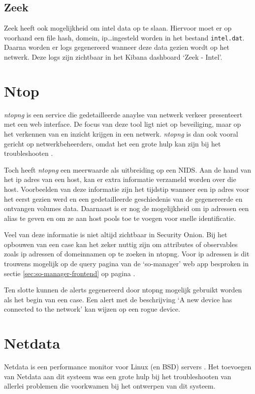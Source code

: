 \documentclass[a4paper,12pt]{report}
\begin{document}
\subsection{Zeek}
Zeek heeft ook mogelijkheid om intel data op te slaan.
Hiervoor moet er op voorhand een file hash, domein, ip\dots ingesteld worden in het bestand \lstinline|intel.dat|.
Daarna worden er logs gegenereerd wanneer deze data gezien wordt op het netwerk.
Deze logs zijn zichtbaar in het Kibana dashboard `Zeek - Intel'.

\section{Ntop}
\emph{ntopng} is een service die gedetailleerde anaylse van netwerk verkeer presenteert met een web interface.
De focus van deze tool ligt niet op beveiliging, maar op het verkennen van en inzicht krijgen in een netwerk.
\emph{ntopng} is dan ook vooral gericht op netwerkbeheerders, omdat het een grote hulp kan zijn bij het troubleshooten \autocite{ntop:ntopng}.

Toch heeft \emph{ntopng} een meerwaarde als uitbreiding op een NIDS.
Aan de hand van het ip adres van een host, kan er extra informatie verzameld worden over die host.
Voorbeelden van deze informatie zijn het tijdstip wanneer een ip adres voor het eerst gezien werd en een gedetailleerde geschiedenis van de gegenereerde en ontvangen volumes data.
Daarnaast is er nog de mogelijkheid om ip adressen een alias te geven en om ze aan host pools toe te voegen voor snelle identificatie.

Veel van deze informatie is niet altijd zichtbaar in Security Onion.
Bij het opbouwen van een case kan het zeker nuttig zijn om attributes of observables zoals ip adressen of domeinnamen op te zoeken in ntopng.
Voor ip adressen is dit trouwens mogelijk op de query pagina van de `so-manager' web app besproken in sectie \ref{sec:so-manager-frontend} op pagina \pageref{sec:so-manager-frontend}.

Ten slotte kunnen de alerts gegenereerd door ntopng mogelijk gebruikt worden als het begin van een case.
Een alert met de beschrijving `A new device has connected to the network' kan wijzen op een rogue device.

\section{Netdata}
Netdata is een performance monitor voor Linux (en BSD) servers \autocite{netdata:home}.
Het toevoegen van Netdata aan dit systeem was een grote hulp bij het troubleshooten van allerlei problemen die voorkwamen bij het ontwerpen van dit systeem.
\end{document}
